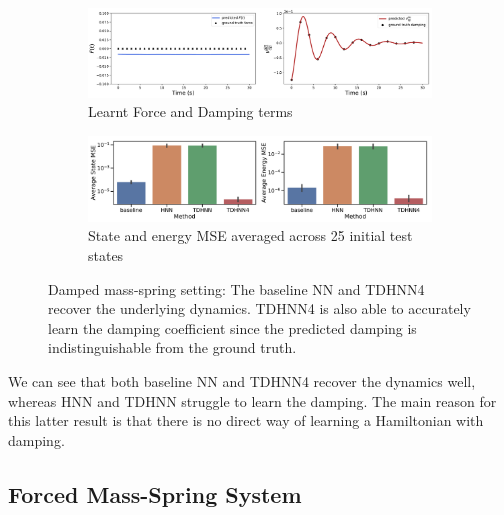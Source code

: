 \documentclass{article}
\begin{document}
\begin{figure}[h!]
\centering
\captionsetup{justification=centering}
	\begin{subfigure}[b]{0.48\textwidth}
		\centering
		\includegraphics[width=\textwidth]{figures/figures/damped/1/damped_dpdt_new_0.pdf}
		\caption{Learnt Force and Damping terms}
	\end{subfigure}
	\begin{subfigure}[b]{0.48\textwidth}
	    \centering
		\includegraphics[width=\textwidth]{figures/figures/damped/1/damped_errors_0.pdf}
		\caption{State and energy MSE averaged across 25 initial test states}
	\end{subfigure}
\caption{Damped mass-spring setting: The baseline NN and TDHNN4 recover the underlying dynamics. TDHNN4 is also able to accurately learn the damping coefficient since the predicted damping is indistinguishable from the ground truth.}
\label{damped}
\end{figure}

We can see that both baseline NN and TDHNN4 recover the dynamics well, whereas HNN and TDHNN struggle to learn the damping. The main reason for this latter result is that there is no direct way of learning a Hamiltonian with damping.

\subsection{Forced Mass-Spring System}
\end{document}
